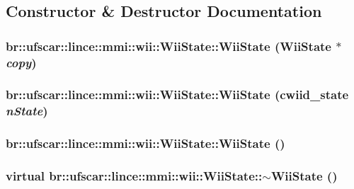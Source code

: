 \subsection{Constructor \& Destructor Documentation}
\hypertarget{classbr_1_1ufscar_1_1lince_1_1mmi_1_1wii_1_1WiiState_a495f2533098a39cab292f4c090f586fc}{
\subsubsection[{WiiState}]{\setlength{\rightskip}{0pt plus 5cm}br::ufscar::lince::mmi::wii::WiiState::WiiState ({\bf WiiState} $\ast$ {\em copy})}}
\label{classbr_1_1ufscar_1_1lince_1_1mmi_1_1wii_1_1WiiState_a495f2533098a39cab292f4c090f586fc}
\hypertarget{classbr_1_1ufscar_1_1lince_1_1mmi_1_1wii_1_1WiiState_a3dcbaf91a80e3638a097c09078776ba0}{
\subsubsection[{WiiState}]{\setlength{\rightskip}{0pt plus 5cm}br::ufscar::lince::mmi::wii::WiiState::WiiState (cwiid\_\-state {\em nState})}}
\label{classbr_1_1ufscar_1_1lince_1_1mmi_1_1wii_1_1WiiState_a3dcbaf91a80e3638a097c09078776ba0}
\hypertarget{classbr_1_1ufscar_1_1lince_1_1mmi_1_1wii_1_1WiiState_aee16d063fff49e2c05d082cc6721b734}{
\subsubsection[{WiiState}]{\setlength{\rightskip}{0pt plus 5cm}br::ufscar::lince::mmi::wii::WiiState::WiiState ()}}
\label{classbr_1_1ufscar_1_1lince_1_1mmi_1_1wii_1_1WiiState_aee16d063fff49e2c05d082cc6721b734}
\hypertarget{classbr_1_1ufscar_1_1lince_1_1mmi_1_1wii_1_1WiiState_a423fdf6e3a03b1094222904c2d513fe0}{
\subsubsection[{$\sim$WiiState}]{\setlength{\rightskip}{0pt plus 5cm}virtual br::ufscar::lince::mmi::wii::WiiState::$\sim$WiiState ()}}
\label{classbr_1_1ufscar_1_1lince_1_1mmi_1_1wii_1_1WiiState_a423fdf6e3a03b1094222904c2d513fe0}


